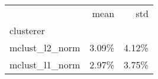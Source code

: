 \begin{tabular}{lrr}
\toprule
{} &  mean &   std \\
clusterer      &       &       \\
\midrule
mclust\_l2\_norm & 3.09\% & 4.12\% \\
mclust\_l1\_norm & 2.97\% & 3.75\% \\
\bottomrule
\end{tabular}

